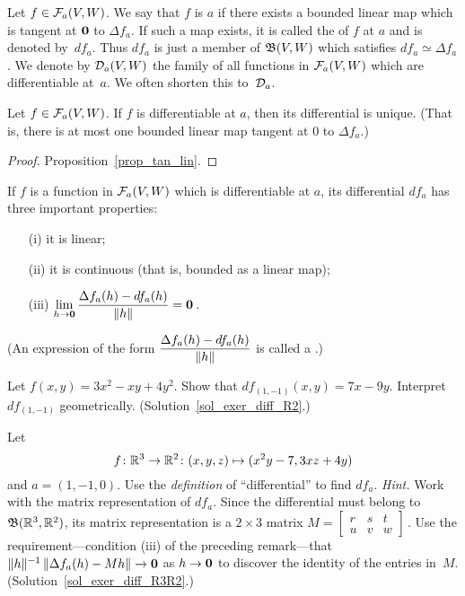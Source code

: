 \begin{defn}  Let $f \in \mathcal{F}_a(V,W)$.  We say that $f$ is
 $a$ if there exists a bounded linear map which is tangent at $\mathbf{0}$ to
$\Delta f_a$. If such a map exists, it is called the
 of $f$ at $a$ and is denoted
by~$df_a$. Thus $df_a$ is just a member of $\mathfrak{B}(V,W)$ which satisfies $df_a \simeq \Delta
f_a$.  We denote by $\mathcal{D}_a(V,W)$ the family of all functions in $\mathcal{F}_a(V,W)$ which are
differentiable at~$a$. We often shorten this to~$\mathcal{D}_a$.
\end{defn}

\begin{prop}\label{prop_diff_uniq}  Let $f \in \mathcal{F}_a(V,W)$. If $f$ is differentiable at $a$,
then its differential is unique. (That is, there is at most one bounded linear map tangent at
$0$ to $\Delta f_a$.)
\end{prop}

\begin{proof} Proposition~\ref{prop_tan_lin}.  \end{proof}

\begin{rem}\label{rem_prop_diff}  If $f$ is a function in $\mathcal{F}_a(V,W)$ which is differentiable
at $a$, its differential $df_a$ has three important properties:
 \begin{enumerate}
  \item[(i)] it is linear;
  \item[(ii)] it is continuous (that is, bounded as a linear map);
  \item[(iii)] $\displaystyle\lim_{h \rightarrow \mathbf{0}} \frac{\Delta f_a(h) - df_a(h)}{\lVert h\rVert} = \mathbf{0}$\,.
 \end{enumerate}
(An expression of the form $\dfrac{\Delta f_a(h) - df_a(h)}{\lVert h\rVert}$ is called a
.)
\end{rem}

\begin{exer}\label{exer_diff_R2}  Let $f(x,y) = 3x^2 - xy + 4y^2$. Show that $df_{(1,-1)}(x,y) =
7x - 9y$.  Interpret $df_{(1,-1)}$ geometrically.  (Solution~\ref{sol_exer_diff_R2}.)
\end{exer}

\begin{exer}\label{exer_diff_R3R2}  Let
  \[ f \colon \mathbb{R}^3 \rightarrow \mathbb{R}^2 \colon (x,y,z) \mapsto (x^2y - 7, 3xz + 4y) \]
and $a = (1,-1,0)$.  Use the \emph{definition} of ``differential'' to find $df_a$.
\emph{Hint.}  Work with the matrix representation of $df_a$.  Since the differential must
belong to $\mathfrak{B}(\mathbb{R}^3,\mathbb{R}^2)$, its matrix representation is a $2 \times 3$ matrix
$M = \begin{bmatrix}
          r  &  s  &  t \\
          u  &  v  &  w
     \end{bmatrix}$\,.  Use the requirement---condition (iii) of the preceding remark---that
$\lVert h\rVert^{-1}\,\lVert\Delta f_a(h) - Mh\rVert \rightarrow \mathbf{0}$ as $h \rightarrow \mathbf{0}$ to discover the
identity of the entries in~$M$.   (Solution~\ref{sol_exer_diff_R3R2}.)
\end{exer}

